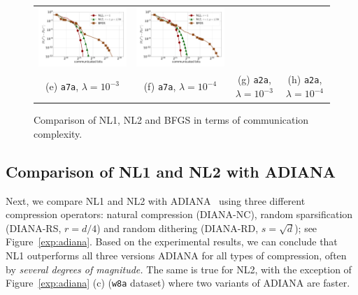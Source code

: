 \documentclass[12pt]{article}
\begin{document}
\begin{figure}[ht]
\begin{center}
{\begin{tabular}{cccc}
				\includegraphics[width = 0.23 \textwidth]{LogReg/a2a/Lambda=1e-3/a2a_nl1_nl2_bfgs_bits_lmb=0.001.pdf}&
				\includegraphics[width = 0.23 \textwidth]{LogReg/a2a/Lambda=1e-4/a2a_nl1_nl2_bfgs_bits_lmb=0.0001.pdf}
				\\
				(e) {\tt a7a}, $\lambda=10^{-3}$ &(f) {\tt a7a}, $\lambda=10^{-4}$ & (g) {\tt a2a}, $\lambda=10^{-3}$ &(h) {\tt a2a}, $\lambda=10^{-4}$
		\end{tabular}}
		\caption{Comparison of {\sf NL1}, {\sf NL2} and BFGS in terms of communication complexity.}
		\label{exp:bfgs}
	\end{center}
\end{figure}








\subsection{Comparison of {\sf NL1} and {\sf NL2} with ADIANA}

Next, we compare {\sf NL1} and {\sf NL2} with ADIANA~\citep{ADIANA} using three different compression operators: natural compression (DIANA-NC),  random sparsification (DIANA-RS, $r = d/4$) and random dithering (DIANA-RD, $s = \sqrt{d}$); see Figure~\ref{exp:adiana}. Based on the experimental results, we can conclude that {\sf NL1} outperforms all three versions ADIANA for all types of compression, often by {\em several degrees of magnitude.} The same is true for  {\sf NL2}, with the exception of Figure~\ref{exp:adiana} (c) ({\tt w8a} dataset) where two variants of ADIANA are faster.
\end{document}
